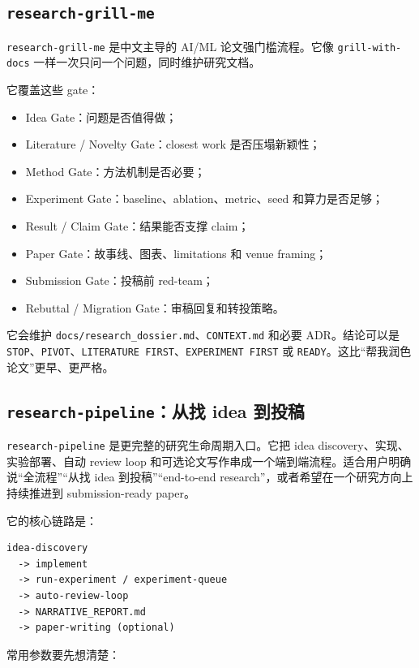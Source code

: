 \documentclass[UTF8,a4paper,11pt,fontset=none]{ctexart}
\newcommand{\skill}[1]{\texttt{#1}}
\newcommand{\file}[1]{\texttt{#1}}
\begin{document}
\subsection{\skill{research-grill-me}}

\skill{research-grill-me} 是中文主导的 AI/ML 论文强门槛流程。它像 \skill{grill-with-docs} 一样一次只问一个问题，同时维护研究文档。

它覆盖这些 gate：

\begin{itemize}
  \item Idea Gate：问题是否值得做；
  \item Literature / Novelty Gate：closest work 是否压塌新颖性；
  \item Method Gate：方法机制是否必要；
  \item Experiment Gate：baseline、ablation、metric、seed 和算力是否足够；
  \item Result / Claim Gate：结果能否支撑 claim；
  \item Paper Gate：故事线、图表、limitations 和 venue framing；
  \item Submission Gate：投稿前 red-team；
  \item Rebuttal / Migration Gate：审稿回复和转投策略。
\end{itemize}

它会维护 \file{docs/research\_dossier.md}、\file{CONTEXT.md} 和必要 ADR。结论可以是 \skill{STOP}、\skill{PIVOT}、\skill{LITERATURE FIRST}、\skill{EXPERIMENT FIRST} 或 \skill{READY}。这比“帮我润色论文”更早、更严格。

\subsection{\skill{research-pipeline}：从找 idea 到投稿}

\skill{research-pipeline} 是更完整的研究生命周期入口。它把 idea discovery、实现、实验部署、自动 review loop 和可选论文写作串成一个端到端流程。适合用户明确说“全流程”“从找 idea 到投稿”“end-to-end research”，或者希望在一个研究方向上持续推进到 submission-ready paper。

它的核心链路是：

\begin{lstlisting}
idea-discovery
  -> implement
  -> run-experiment / experiment-queue
  -> auto-review-loop
  -> NARRATIVE_REPORT.md
  -> paper-writing (optional)
\end{lstlisting}

常用参数要先想清楚：
\end{document}
